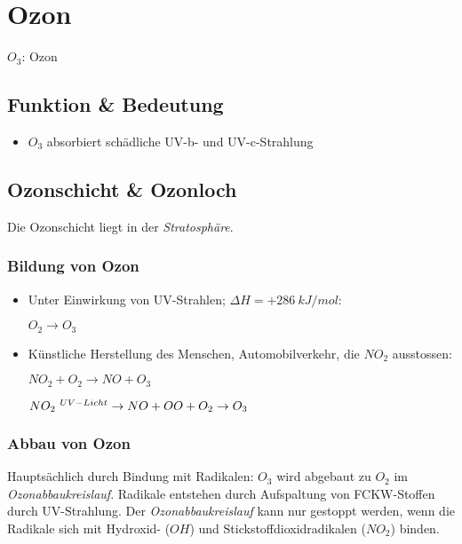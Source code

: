 \section{Ozon}

$O_3$: Ozon

\subsection{Funktion \& Bedeutung}

\begin{itemize}
	\item $O_3$ absorbiert schädliche UV-b- und UV-c-Strahlung
\end{itemize}

\subsection{Ozonschicht \& Ozonloch}

Die Ozonschicht liegt in der \textit{Stratosphäre}.

\subsubsection{Bildung von Ozon}

\begin{itemize}
	\item Unter Einwirkung von UV-Strahlen; $\Delta H = +286\ kJ/mol$:
	
	{\large $O_2 \rightarrow O_3$}
	
	\item Künstliche Herstellung des Menschen, Automobilverkehr, die $NO_2$ ausstossen:
	
	{\large
		$NO_2 + O_2 \rightarrow NO + O_3$
		
		$NO_2 \ ^{ UV-Licht}\rightarrow NO + O \\
		O + O_2 \rightarrow O_3$
	}
\end{itemize}



\subsubsection{Abbau von Ozon}

Hauptsächlich durch Bindung mit Radikalen: $O_3$ wird abgebaut zu $O_2$ im \textit{Ozonabbaukreislauf}. Radikale entstehen durch Aufspaltung von FCKW-Stoffen durch UV-Strahlung. Der \textit{Ozonabbaukreislauf} kann nur gestoppt werden, wenn die Radikale sich mit Hydroxid- ($OH$) und Stickstoffdioxidradikalen ($NO_2$) binden.

